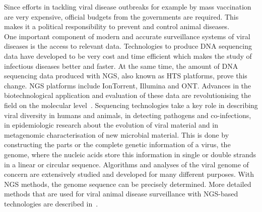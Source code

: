 Since efforts in tackling viral disease outbreaks for example by mass vaccination are very expensive, official budgets from the governments are required. This makes it a political responsibility to prevent and control animal diseases. \\
One important component of modern and accurate surveillance systems of viral diseases is the access to relevant data. Technologies to produce \ac{DNA} sequencing data have developed to be very cost and time efficient which makes the study of infectious diseases better and faster. At the same time, the amount of \ac{DNA} sequencing data produced with \ac{NGS}, also known as \ac{HTS} platforms, prove this change. \ac{NGS} platforms include IonTorrent, Illumina and \ac{ONT}. Advances in the biotechnological application and evaluation of these data are revolutionising the field on the molecular level~\cite{suminda2022high}. Sequencing technologies take a key role in describing viral diversity in humans and animals, in detecting pathogens and co-infections, in epidemiologic research about the evolution of viral material and in metagenomic characterisation of new microbial material. This is done by constructing the parts or the complete genetic information of a virus, the genome, where the nucleic acids store this information in single or double strands in a linear or circular sequence. Algorithms and analyses of the viral genome of concern are extensively studied and developed for many different purposes. With \ac{NGS} methods, the genome sequence can be precisely determined. More detailed methods that are used for viral animal disease surveillance with \ac{NGS}-based technologies are described in~.

